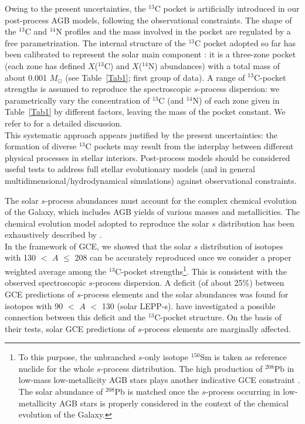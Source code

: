 \documentclass[manuscript]{aastex}
\begin{document}
Owing to the present uncertainties, the $^{13}$C pocket is artificially introduced
in our post-process AGB models, following the observational constraints.
The shape of the $^{13}$C 
and $^{14}$N profiles and the mass involved in the pocket are regulated by 
a free parametrization. 
The internal structure of the $^{13}$C pocket adopted so far has been calibrated to 
represent the solar main component \citep{arlandini99}: it is a three-zone pocket
(each zone has defined $X$($^{13}$C) and $X$($^{14}$N) abundances) with a total mass 
of about 0.001 $M_\odot$ (see Table~\ref{Tab1}; first group of data).  
A range of $^{13}$C-pocket strengths is assumed to reproduce the spectroscopic 
$s$-process dispersion: 
we parametrically vary the concentration of $^{13}$C (and $^{14}$N) of each zone 
given in Table~\ref{Tab1} by different factors,
leaving the mass of the pocket constant. 
We refer to \citet{bisterzo10,bisterzo14} for a detailed discussion.
\\
This systematic approach appears justified by the present 
uncertainties: the formation of diverse $^{13}$C pockets may result from 
the interplay between different physical processes in stellar interiors.
Post-process models should be considered 
 useful tests to address full stellar evolutionary models (and in general 
multidimensional/hydrodynamical simulations) against observational constraints.







The solar $s$-process abundances must account for the complex chemical evolution 
of the Galaxy, which includes AGB yields of various masses and metallicities.
The chemical evolution model adopted to reproduce the solar $s$ distribution has been
exhaustively described by \citet{travaglio99,travaglio04}. 
\\
In the framework of GCE, we showed that the solar $s$ distribution of isotopes with 
130 $<$ $A$ $\leq$ 208 can be accurately reproduced once we consider 
a proper weighted average among the $^{13}$C-pocket strengths\footnote{To this purpose, the 
unbranched $s$-only 
isotope $^{150}$Sm is taken as reference nuclide for the whole $s$-process distribution.
The high production of $^{208}$Pb in low-mass low-metallicity AGB stars plays
another indicative GCE constraint \citep{travaglio01}.
The solar abundance of $^{208}$Pb is matched once the $s$-process occurring in low-metallicity 
AGB stars is properly considered in the context of the chemical evolution of the Galaxy.}. 
This is consistent with the observed spectroscopic $s$-process dispersion.
A deficit (of about 25\%) between GCE predictions of $s$-process
elements and the solar abundances was found for
isotopes with 90 $<$ $A$ $<$ 130 (solar LEPP-s).
\citet{bisterzo14} have investigated a possible connection between this deficit and the 
$^{13}$C-pocket structure. On the basis of their tests, solar GCE predictions of $s$-process
elements are marginally affected. 
\end{document}
